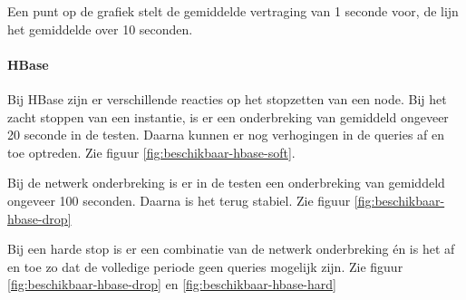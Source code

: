 Een punt op de grafiek stelt de gemiddelde vertraging van 1 seconde voor, de lijn het gemiddelde over 10 seconden. 

\paragraph{HBase}
Bij HBase zijn er verschillende reacties op het stopzetten van een node. Bij het zacht stoppen van een instantie, is er een onderbreking van gemiddeld ongeveer 20 seconde in de testen. Daarna kunnen er nog verhogingen in de queries af en toe optreden. Zie figuur \ref{fig:beschikbaar-hbase-soft}. 

Bij de netwerk onderbreking is er in de testen een onderbreking van gemiddeld ongeveer 100 seconden. Daarna is het terug stabiel. Zie figuur \ref{fig:beschikbaar-hbase-drop}

Bij een harde stop is er een combinatie van de netwerk onderbreking én is het af en toe zo dat de volledige periode geen queries mogelijk zijn. Zie figuur \ref{fig:beschikbaar-hbase-drop} en \ref{fig:beschikbaar-hbase-hard}

